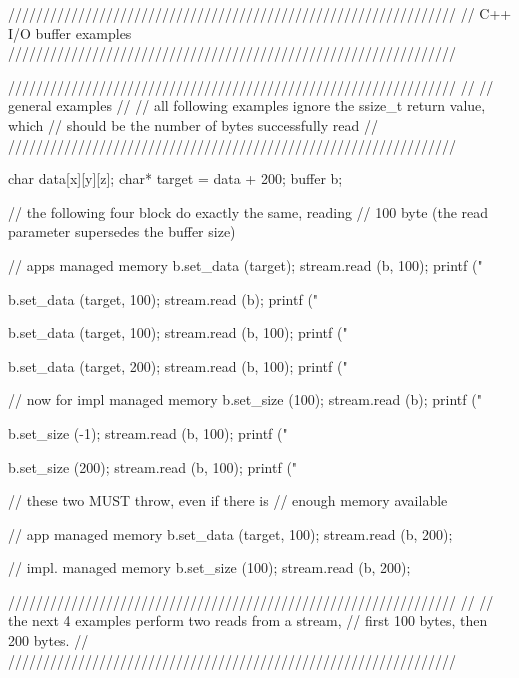  \begin{mycode}
  ////////////////////////////////////////////////////////////////
  // C++ I/O buffer examples
  ////////////////////////////////////////////////////////////////
  
  ////////////////////////////////////////////////////////////////
  //
  // general examples
  //
  // all following examples ignore the ssize_t return value, which 
  // should be the number of bytes successfully read
  //
  ////////////////////////////////////////////////////////////////
  {
    char data[x][y][z];
    char* target = data + 200;
    buffer b;
    
    // the following four block do exactly the same, reading 
    // 100 byte (the read parameter supersedes the buffer size)
  
    // apps managed memory
    {
      b.set_data (target);
      stream.read (b, 100);
      printf ("%
    }
  
    {
      b.set_data (target, 100);
      stream.read (b);
      printf ("%
    }
  
    {
      b.set_data (target, 100);
      stream.read (b, 100);
      printf ("%
    }
  
    {
      b.set_data (target, 200);
      stream.read (b, 100);
      printf ("%
    }
  
  
    // now for impl managed memory
    {
      b.set_size (100);
      stream.read (b);
      printf ("%
    }
  
    {
      b.set_size (-1);
      stream.read (b, 100);
      printf ("%
    }
  
    {
      b.set_size (200);
      stream.read (b, 100);
      printf ("%
    }
  
  
    // these two MUST throw, even if there is 
    // enough memory available
  
    // app managed memory
    {
      b.set_data (target, 100);
      stream.read (b, 200);
    }
  
    // impl. managed memory
    {
      b.set_size (100);
      stream.read (b, 200);
    }
  }
  
  
  ////////////////////////////////////////////////////////////////
  //
  // the next 4 examples perform two reads from a stream, 
  // first 100 bytes, then 200 bytes.
  //
  ////////////////////////////////////////////////////////////////
  

\end{mycode}
